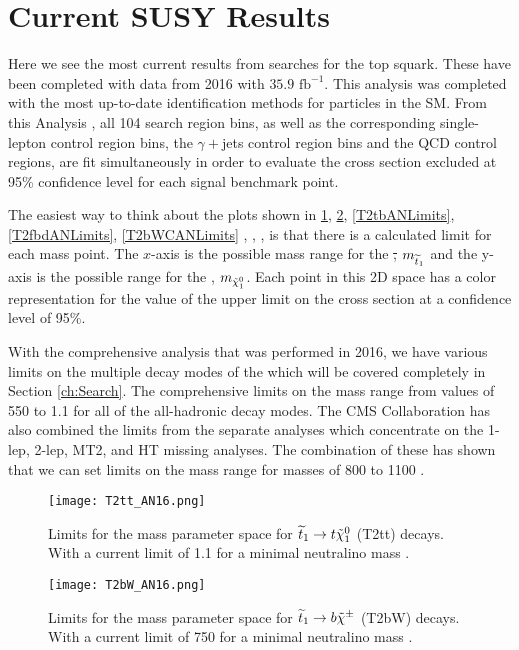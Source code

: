 \section{Current SUSY Results}\label{CurrentResults}

Here we see the most current results from searches for the top squark. These have been completed with data from 2016 with $35.9 \text{ fb}^{-1}$. This analysis was completed with the most up-to-date identification methods for particles in the SM. From this Analysis \cite{noauthor_search_nodate}, all 104 search region bins, as well as the corresponding single-lepton control region bins, the $\gamma+$jets control region bins and the QCD control regions, are fit simultaneously in order to evaluate the cross section excluded at 95\% confidence level for each signal benchmark point. 

The easiest way to think about the plots shown in \ref{T2ttANLimits}, \ref{T2bWANLimits}, \ref{T2tbANLimits}, \ref{T2fbdANLimits}, \ref{T2bWCANLimits} \cite{alwall_simplified_2009}, \cite{alwall_model-independent_2009}, \cite{feng_dark_2010}, is that there is a calculated limit for each mass point. The $x$-axis is the possible mass range for the \st, $m_{\widetilde{t}_1}$ and the y-axis is the possible range for the \neutralino, $m_{\tilde{\chi}^{0}_{1}}$. Each point in this 2D space has a color representation for the value of the upper limit on the cross section at a confidence level of 95\%. 

With the comprehensive analysis that was performed in 2016, we have various limits on the multiple decay modes of the \st{} which will be covered completely in Section \ref{ch:Search}. The comprehensive limits on the \st{} mass range from values of 550 to 1.1 \TeV{} for all of the all-hadronic decay modes. The CMS Collaboration has also combined the limits from the separate analyses which concentrate on the 1-lep, 2-lep, MT2, and HT missing analyses. The combination of these has shown that we can set limits on the \st{} mass range for masses of 800 to 1100 \GeV. 

\begin{figure}
\centering
	\texttt{[image: T2tt\_AN16.png]}
 	\caption[T2tt Limits]{Limits for the mass parameter space for $\widetilde{t}_1\rightarrow t \tilde{\chi}^{0}_{1}$ (T2tt) decays. With a current limit of 1.1 \TeV{} for a minimal neutralino mass \cite{noauthor_search_nodate}.}
 	\label{T2ttANLimits} 
\end{figure}

\begin{figure}
\centering
	\texttt{[image: T2bW\_AN16.png]}
 	\caption[T2bW Limits]{Limits for the mass parameter space for $\widetilde{t}_1\rightarrow b \tilde{\chi}^{\pm}$ (T2bW) decays. With a current limit of 750 \GeV{} for a minimal neutralino mass \cite{noauthor_search_nodate}.}
 	\label{T2bWANLimits} 
\end{figure}

